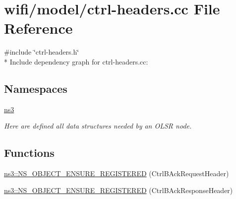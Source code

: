 \hypertarget{ctrl-headers_8cc}{}\section{wifi/model/ctrl-\/headers.cc File Reference}
\label{ctrl-headers_8cc}
{\ttfamily \#include \char`\"{}ctrl-\/headers.\+h\char`\"{}}\\*
Include dependency graph for ctrl-\/headers.cc\+:
\subsection*{Namespaces}
\begin{DoxyCompactItemize}
\item 
 \hyperlink{namespacens3}{ns3}
\begin{DoxyCompactList}\small\item\em Here are defined all data structures needed by an O\+L\+SR node. \end{DoxyCompactList}\end{DoxyCompactItemize}
\subsection*{Functions}
\begin{DoxyCompactItemize}
\item 
\hyperlink{namespacens3_a77f5504174af3c8a170bf72e8344341a}{ns3\+::\+N\+S\+\_\+\+O\+B\+J\+E\+C\+T\+\_\+\+E\+N\+S\+U\+R\+E\+\_\+\+R\+E\+G\+I\+S\+T\+E\+R\+ED} (Ctrl\+B\+Ack\+Request\+Header)
\item 
\hyperlink{namespacens3_aa85f48557b75abe36f312b068e10156d}{ns3\+::\+N\+S\+\_\+\+O\+B\+J\+E\+C\+T\+\_\+\+E\+N\+S\+U\+R\+E\+\_\+\+R\+E\+G\+I\+S\+T\+E\+R\+ED} (Ctrl\+B\+Ack\+Response\+Header)
\end{DoxyCompactItemize}

